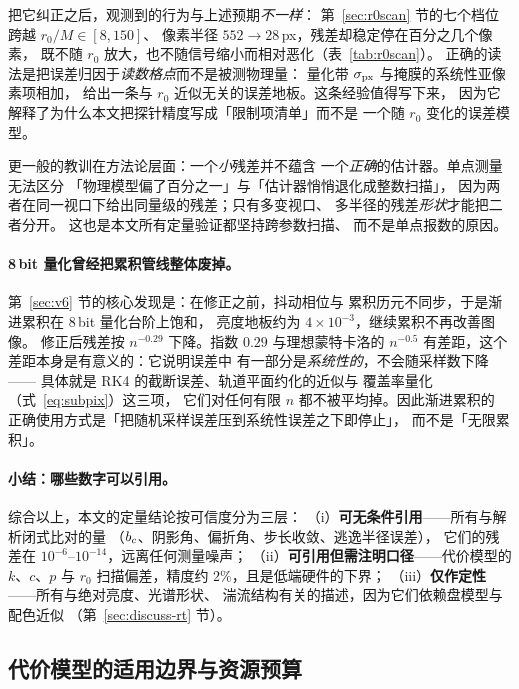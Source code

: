 把它纠正之后，观测到的行为与上述预期\emph{不一样}：
第~\ref{sec:r0scan} 节的七个档位跨越 $r_0/M\in[8,150]$、
像素半径 $552\to28$\,px，残差却稳定停在百分之几个像素，
既不随 $r_0$ 放大，也不随信号缩小而相对恶化（表~\ref{tab:r0scan}）。
正确的读法是把误差归因于\emph{读数格点}而不是被测物理量：
量化带 $\sigma_{\rm px}$ 与掩膜的系统性亚像素项相加，
给出一条与 $r_0$ 近似无关的误差地板。这条经验值得写下来，
因为它解释了为什么本文把探针精度写成「限制项清单」而不是
一个随 $r_0$ 变化的误差模型。

更一般的教训在方法论层面：一个\emph{小}残差并不蕴含
一个\emph{正确}的估计器。单点测量无法区分
「物理模型偏了百分之一」与「估计器悄悄退化成整数扫描」，
因为两者在同一视口下给出同量级的残差；只有多变视口、
多半径的残差\emph{形状}才能把二者分开。
这也是本文所有定量验证都坚持跨参数扫描、
而不是单点报数的原因。

\paragraph{8\,bit 量化曾经把累积管线整体废掉。}
第~\ref{sec:v6} 节的核心发现是：在修正之前，抖动相位与
累积历元不同步，于是渐进累积在 $8$\,bit 量化台阶上饱和，
亮度地板约为 $4\times10^{-3}$，继续累积不再改善图像。
修正后残差按 $n^{-0.29}$ 下降。指数 $0.29$ 与理想蒙特卡洛的
$n^{-0.5}$ 有差距，这个差距本身是有意义的：它说明误差中
有一部分是\emph{系统性的}，不会随采样数下降——
具体就是 RK4 的截断误差、轨道平面约化的近似与
覆盖率量化（式~\eqref{eq:subpix}）这三项，
它们对任何有限 $n$ 都不被平均掉。因此渐进累积的
正确使用方式是「把随机采样误差压到系统性误差之下即停止」，
而不是「无限累积」。

\paragraph{小结：哪些数字可以引用。}
综合以上，本文的定量结论按可信度分为三层：
（i）\textbf{可无条件引用}——所有与解析闭式比对的量
（$b_{c}$、阴影角、偏折角、步长收敛、逃逸半径误差），
它们的残差在 $10^{-6}$--$10^{-14}$，远离任何测量噪声；
（ii）\textbf{可引用但需注明口径}——代价模型的 $k$、$c$、$p$
与 $r_0$ 扫描偏差，精度约 $2\%$，且是低端硬件的下界；
（iii）\textbf{仅作定性}——所有与绝对亮度、光谱形状、
湍流结构有关的描述，因为它们依赖盘模型与配色近似
（第~\ref{sec:discuss-rt} 节）。

\subsection{代价模型的适用边界与资源预算}\label{sec:discuss-perf}

